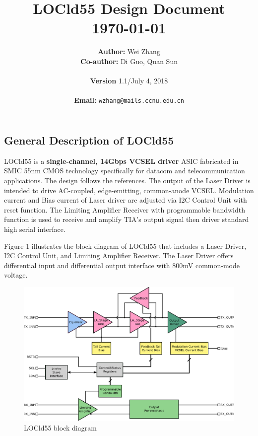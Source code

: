 \documentclass[11pt,a4paper]{article}
\title{ \LARGE \textbf{{LOCld55 Design Document}}
        \HRule{2.5pt} \\[0.5cm]
        \normalsize \today
}
\author{
        \textbf{Author:} Wei Zhang\\
        \textbf{Co-author:} Di Guo, Quan Sun\\
        \textbf{}\\
        \textbf{Version} 1.1/July 4, 2018\\
        \textbf{}\\
        \textbf{Email:} \texttt{wzhang@mails.ccnu.edu.cn}\\
}
\makeatletter
\def\printtitle{{\centering \@title\par}}
\def\printauthor{{\centering \large \@author}}
\makeatother
\begin{document}
\printtitle
\vfill                          %

\printauthor
\begin{spacing}{1.25}           %


\thispagestyle{empty}           %

\newpage

\tableofcontents                %

\thispagestyle{empty}           %

\newpage

\setcounter{page}{1}

\section{General Description of LOCld55}    %

LOCld55 is a \textbf{single-channel, 14Gbps VCSEL driver} ASIC fabricated in SMIC 55nm CMOS technology specifically for datacom and telecommunication applications. The design follows the references\cite{ref1}. The output of the Laser Driver is intended to drive AC-coupled, edge-emitting, common-anode VCSEL. Modulation current and Bias current of Laser driver are adjusted via I2C Control Unit with reset function. The Limiting Amplifier Receiver with programmable bandwidth function is used to receive and amplify TIA's output signal then driver standard high serial interface. 

Figure 1 illustrates the block diagram of LOCld55 that includes a Laser Driver, I2C Control Unit, and Limiting Amplifier Receiver. The Laser Driver offers differential input and differential output interface with 800mV common-mode voltage.

\begin{figure}[H]
    \includegraphics[width=\linewidth]{./Img/locld55.png}
    \caption{LOCld55 block diagram}
\end{figure}


\end{spacing}
\end{document}
